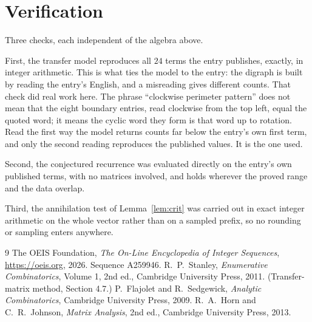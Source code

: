 \documentclass[11pt,a4paper]{article}
\theoremstyle{plain}
\theoremstyle{definition}
\begin{document}
\section{Verification}

Three checks, each independent of the algebra above.

First, the transfer model reproduces all $24$ terms the entry publishes, exactly, in
integer arithmetic. This is what ties the model to the entry: the digraph is built by reading
the entry's English, and a misreading gives different counts. That check did real work here. The phrase ``clockwise perimeter pattern'' does not mean that the eight boundary entries, read clockwise from the top left, equal the quoted word; it means the cyclic word they form is that word up to rotation. Read the first way the model returns counts far below the entry's own first term, and only the second reading reproduces the published values. It is the one used.

Second, the conjectured recurrence was evaluated directly on the entry's own published terms,
with no matrices involved, and holds wherever the proved range and the data overlap.

Third, the annihilation test of Lemma~\ref{lem:crit} was carried out in exact integer
arithmetic on the whole vector rather than on a sampled prefix, so no rounding or sampling
enters anywhere.

\begin{thebibliography}{9}
 The OEIS Foundation, \emph{The On-Line Encyclopedia of Integer
Sequences}, \url{https://oeis.org}, 2026. Sequence A259946.
 R.~P.~Stanley, \emph{Enumerative Combinatorics}, Volume 1, 2nd ed.,
Cambridge University Press, 2011. (Transfer-matrix method, Section 4.7.)
 P.~Flajolet and R.~Sedgewick, \emph{Analytic Combinatorics}, Cambridge
University Press, 2009.
 R.~A.~Horn and C.~R.~Johnson, \emph{Matrix Analysis}, 2nd ed., Cambridge
University Press, 2013.
\end{thebibliography}
\end{document}
